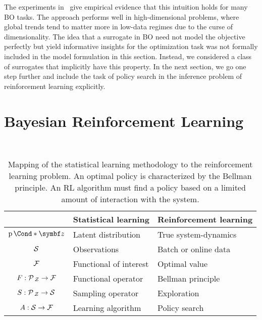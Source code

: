 The experiments in~\parencite{bodin_modulating_2020} give empirical evidence that this intuition holds for many BO tasks.
The approach performs well in high-dimensional problems, where global trends tend to matter more in low-data regimes due to the curse of dimensionality.
The idea that a surrogate in BO need not model the objective perfectly but yield informative insights for the optimization task was not formally included in the model formulation in this section.
Instead, we considered a class of surrogates that implicitly have this property.
In the next section, we go one step further and include the task of policy search in the inference problem of reinforcement learning explicitly.


\section{Bayesian Reinforcement Learning}
\label{toc:discussion:mountaincar}
\begin{table}[t]
    \caption[Statistical learning methodology in reinforcement learning]{
        \label{tab:mountaincar:quantities_of_interest}
        Mapping of the statistical learning methodology to the reinforcement learning problem.
        An optimal policy is characterized by the Bellman principle.
        An RL algorithm must find a policy based on a limited amount of interaction with the system.
    }
    \centering
    \\[\figureskip]
    \begin{tabularx}{.9\textwidth}{cYY}
        \toprule
                                  & Statistical learning   & Reinforcement learning \\
        \midrule
        $\Prob*{\mat{z}}$         & Latent distribution    & True system-dynamics   \\
        $\mathcal{S}$                     & Observations           & Batch or online data   \\
        $\mathcal{F}$                     & Functional of interest & Optimal value          \\
        \midrule
        $F : \operatorname{\mathcal{P}\mkern2mu}_{\mathcal{Z}} \to \mathcal{F}$ & Functional operator    & Bellman principle      \\
        $S : \operatorname{\mathcal{P}\mkern2mu}_{\mathcal{Z}} \to \mathcal{S}$ & Sampling operator      & Exploration            \\
        $A : \mathcal{S} \to \mathcal{F}$         & Learning algorithm     & Policy search          \\
        \bottomrule
    \end{tabularx}
\end{table}
